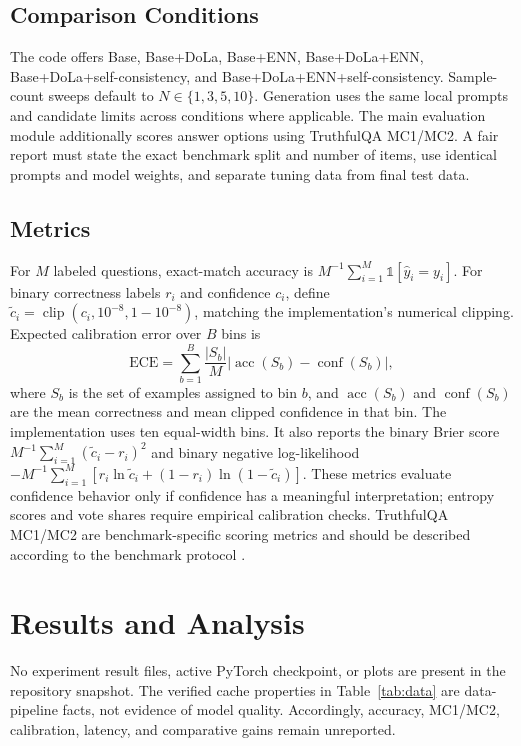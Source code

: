 \documentclass[conference]{IEEEtran}
\begin{document}
\subsection{Comparison Conditions}
The code offers Base, Base+DoLa, Base+ENN, Base+DoLa+ENN, Base+DoLa+self-consistency, and Base+DoLa+ENN+self-consistency. Sample-count sweeps default to $N\in\{1,3,5,10\}$. Generation uses the same local prompts and candidate limits across conditions where applicable. The main evaluation module additionally scores answer options using TruthfulQA MC1/MC2. A fair report must state the exact benchmark split and number of items, use identical prompts and model weights, and separate tuning data from final test data.

\subsection{Metrics}
For $M$ labeled questions, exact-match accuracy is $M^{-1}\sum_{i=1}^{M} \mathbb{1}[\hat y_i=y_i]$. For binary correctness labels $r_i$ and confidence $c_i$, define $\tilde c_i=\operatorname{clip}(c_i,10^{-8},1-10^{-8})$, matching the implementation's numerical clipping. Expected calibration error over $B$ bins is
\begin{equation}
 \mathrm{ECE}=\sum_{b=1}^{B}\frac{|S_b|}{M}\left|\operatorname{acc}(S_b)-\operatorname{conf}(S_b)\right|,
\end{equation}
where $S_b$ is the set of examples assigned to bin $b$, and $\operatorname{acc}(S_b)$ and $\operatorname{conf}(S_b)$ are the mean correctness and mean clipped confidence in that bin. The implementation uses ten equal-width bins. It also reports the binary Brier score $M^{-1}\sum_{i=1}^{M}(\tilde c_i-r_i)^2$ and binary negative log-likelihood $-M^{-1}\sum_{i=1}^{M}[r_i\ln\tilde c_i+(1-r_i)\ln(1-\tilde c_i)]$. These metrics evaluate confidence behavior only if confidence has a meaningful interpretation; entropy scores and vote shares require empirical calibration checks. TruthfulQA MC1/MC2 are benchmark-specific scoring metrics and should be described according to the benchmark protocol \cite{lin2022truthfulqa}.

\section{Results and Analysis}
No experiment result files, active PyTorch checkpoint, or plots are present in the repository snapshot. The verified cache properties in Table~\ref{tab:data} are data-pipeline facts, not evidence of model quality. Accordingly, accuracy, MC1/MC2, calibration, latency, and comparative gains remain unreported.
\end{document}

